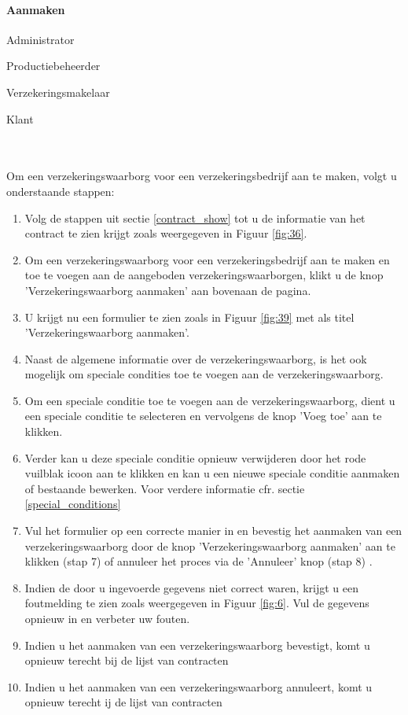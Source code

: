 \documentclass[11pt,openany]{article}
\newcommand{\cmark}{\ding{51}}%
\newcommand{\xmark}{\ding{55}}%
\newcommand{\done}{\rlap{$\square$}{\raisebox{2pt}{\large\hspace{1pt}\cmark}}%
	\hspace{-2.5pt}}
\newcommand{\wontfix}{\rlap{$\square$}{\large\hspace{1pt}\xmark}}
\begin{document}
\paragraph{Aanmaken}
\begin{todolist}
	\item[\done] Administrator
	\item[\done] Productiebeheerder
	\item[\done] Verzekeringsmakelaar
	\item[\wontfix] Klant 
\end{todolist}
\\
\\
Om een verzekeringswaarborg voor een verzekeringsbedrijf aan te maken, volgt u onderstaande stappen:
\begin{enumerate}
	\item  Volg de stappen uit sectie \ref{contract_show} tot u de informatie van het contract te zien krijgt zoals weergegeven in Figuur \ref{fig:36}.
	\item Om een verzekeringswaarborg voor een verzekeringsbedrijf  aan te maken en toe te voegen aan de aangeboden verzekeringswaarborgen, klikt u de knop 'Verzekeringswaarborg aanmaken' aan bovenaan de pagina.
	\item U krijgt nu een formulier te zien zoals in Figuur \ref{fig:39} met als titel 'Verzekeringswaarborg aanmaken'.
	\item Naast de algemene informatie over de verzekeringswaarborg, is het ook mogelijk om speciale condities toe te voegen aan de verzekeringswaarborg.
	\item Om een speciale conditie toe te voegen aan de verzekeringswaarborg, dient u een speciale conditie te selecteren en vervolgens de knop 'Voeg toe' aan te klikken.
	\item Verder kan u deze speciale conditie opnieuw verwijderen door het rode vuilblak icoon aan te klikken en kan u een nieuwe speciale conditie aanmaken of bestaande bewerken. Voor verdere informatie cfr. sectie \ref{special_conditions}
	\item Vul het formulier op een correcte manier in en bevestig het aanmaken van een verzekeringswaarborg door de knop 'Verzekeringswaarborg aanmaken' aan te klikken (stap 7) of annuleer het proces via de 'Annuleer' knop (stap 8) .
	\item Indien de door u ingevoerde gegevens niet correct waren, krijgt u een foutmelding te zien zoals weergegeven in Figuur \ref{fig:6}. Vul de gegevens opnieuw in en verbeter uw fouten.
	\item Indien u het aanmaken van een verzekeringswaarborg bevestigt, komt u opnieuw terecht bij de lijst van contracten
	\item Indien u het aanmaken van een verzekeringswaarborg annuleert, komt u opnieuw terecht ij de lijst van contracten
\end{enumerate}
\end{document}
